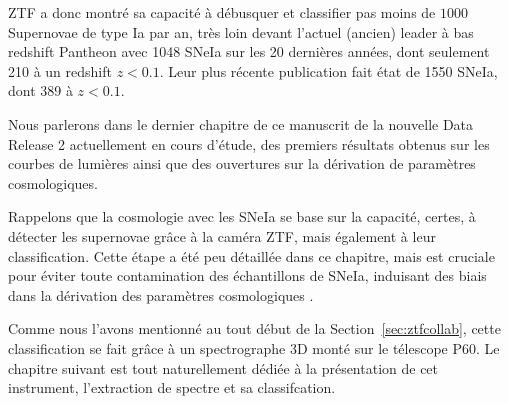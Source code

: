 \documentclass[../main/main.tex]{subfiles}
\begin{document}
ZTF a donc montré sa capacité à débusquer et classifier pas moins de
$1000$ Supernovae de type Ia par an, très loin devant l'actuel (ancien)
leader à bas redshift Pantheon \citep{Scolnicpantheon18} avec 1048 SNeIa
sur les 20 dernières années, dont seulement 210 à un redshift
$z<0.1$. Leur plus récente publication
\citep[Pantheon+,][]{Scolnicpantheon21} fait état de 1550 SNeIa, dont 389 à $z<0.1$.

Nous parlerons dans le dernier chapitre de ce manuscrit de la nouvelle
Data Release 2 actuellement en cours d'étude, des premiers résultats obtenus sur les courbes de
lumières ainsi que des ouvertures sur la dérivation de paramètres
cosmologiques.

Rappelons que la cosmologie avec les SNeIa se base sur la capacité, certes, à
détecter les supernovae grâce à la caméra ZTF, mais également à leur
classification. Cette étape a été peu détaillée dans ce chapitre, mais
est cruciale pour éviter toute contamination des échantillons de SNeIa,
induisant des biais dans la dérivation des paramètres cosmologiques
\citep{JonesScolnic17SNcontam}.

Comme nous l'avons mentionné au tout
début de la Section~\ref{sec:ztfcollab}, cette classification se fait
grâce à un spectrographe 3D monté sur le télescope P60. Le chapitre
suivant est tout naturellement dédiée à la présentation de cet
instrument, l'extraction de spectre et sa classifcation.


%
%
\end{document}
